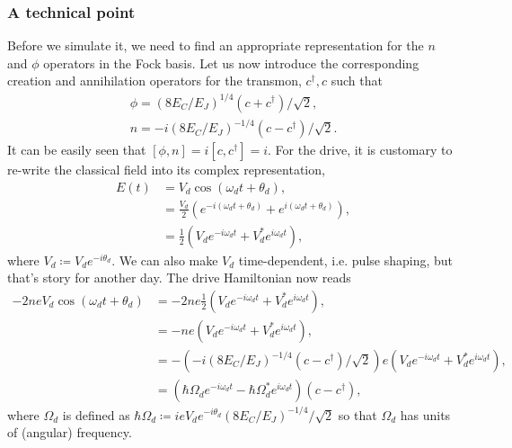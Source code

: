 \documentclass{article}
\begin{document}
\subsubsection{A technical point}

Before we simulate it, we need to find an appropriate representation for the $n$ and $\phi$ operators in the Fock basis. Let us now introduce the corresponding creation and annihilation operators for the transmon, $c^\dagger, c$ such that
\begin{align}
    \phi = (8E_C/E_J)^{1/4}(c+c^\dagger)/\sqrt{2},\\
    n = -i(8E_C/E_J)^{-1/4}(c-c^\dagger)/\sqrt{2}. 
\end{align}
It can be easily seen that $[\phi, n] = i[c, c^\dagger] = i$. For the drive, it is customary to re-write the classical field into its complex representation,
\begin{align}
    E(t) &= V_d\cos(\omega_d t +\theta_d),\\
    &= \frac{V_d}{2}(e^{-i(\omega_d t+\theta_d)}+e^{i(\omega_d t+\theta_d)}),\\
    &=\frac{1}{2}(V_de^{-i\omega_d t}+V_d^*e^{i\omega_d t}),
\end{align}
where $V_d\coloneqq V_de^{-i\theta_d}$. We can also make $V_d$ time-dependent, i.e. pulse shaping, but that's story for another day. The drive Hamiltonian now reads
\begin{align}
    -2neV_d\cos(\omega_d t + \theta_d)&=-2ne\frac{1}{2}(V_de^{-i\omega_d t}+V_d^*e^{i\omega_d t}),\\
    &=-ne(V_de^{-i\omega_d t}+V_d^*e^{i\omega_d t}),\\
    &=-(-i(8E_C/E_J)^{-1/4}(c-c^\dagger)/\sqrt{2})e(V_de^{-i\omega_d t}+V_d^*e^{i\omega_d t}),\\
    &=(\hbar\Omega_de^{-i\omega_d t}-\hbar\Omega_d^*e^{i\omega_d t})(c-c^\dagger),
\end{align}
where $\Omega_d$ is defined as $\hbar\Omega_d\coloneqq ieV_de^{-i\theta_d}(8E_C/E_J)^{-1/4}/\sqrt{2}$ so that $\Omega_d$ has units of (angular) frequency. 
\end{document}
